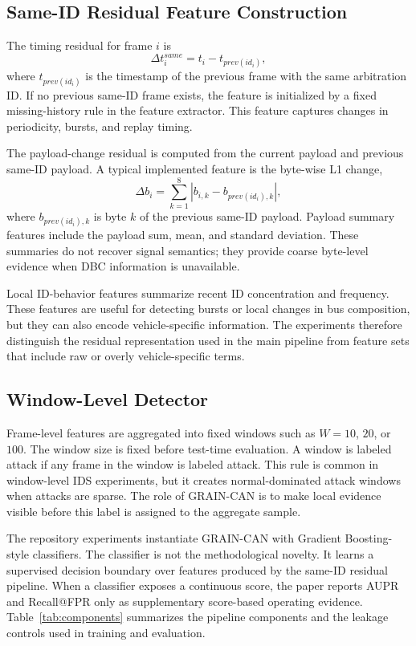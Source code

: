\documentclass[runningheads]{llncs}
\newcommand{\method}{GRAIN-CAN}
\begin{document}
\subsection{Same-ID Residual Feature Construction}
The timing residual for frame \(i\) is
\begin{equation}
  \Delta t^{same}_i = t_i - t_{prev(id_i)},
\end{equation}
where \(t_{prev(id_i)}\) is the timestamp of the previous frame with the same arbitration ID. If no previous same-ID frame exists, the feature is initialized by a fixed missing-history rule in the feature extractor. This feature captures changes in periodicity, bursts, and replay timing.

The payload-change residual is computed from the current payload and previous same-ID payload. A typical implemented feature is the byte-wise L1 change,
\begin{equation}
  \Delta b_i = \sum_{k=1}^{8} |b_{i,k} - b_{prev(id_i),k}|,
\end{equation}
where \(b_{prev(id_i),k}\) is byte \(k\) of the previous same-ID payload. Payload summary features include the payload sum, mean, and standard deviation. These summaries do not recover signal semantics; they provide coarse byte-level evidence when DBC information is unavailable.

Local ID-behavior features summarize recent ID concentration and frequency. These features are useful for detecting bursts or local changes in bus composition, but they can also encode vehicle-specific information. The experiments therefore distinguish the residual representation used in the main pipeline from feature sets that include raw or overly vehicle-specific terms.

\subsection{Window-Level Detector}
Frame-level features are aggregated into fixed windows such as \(W=10\), \(20\), or \(100\). The window size is fixed before test-time evaluation. A window is labeled attack if any frame in the window is labeled attack. This rule is common in window-level IDS experiments, but it creates normal-dominated attack windows when attacks are sparse. The role of \method{} is to make local evidence visible before this label is assigned to the aggregate sample.

The repository experiments instantiate \method{} with Gradient Boosting-style classifiers. The classifier is not the methodological novelty. It learns a supervised decision boundary over features produced by the same-ID residual pipeline. When a classifier exposes a continuous score, the paper reports AUPR and Recall@FPR only as supplementary score-based operating evidence. Table~\ref{tab:components} summarizes the pipeline components and the leakage controls used in training and evaluation.
\end{document}
